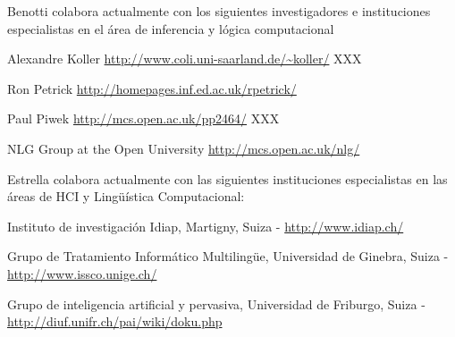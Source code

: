 Benotti colabora actualmente con los siguientes investigadores e instituciones especialistas en el \'area de inferencia y l\'ogica
computacional

\begin{myitemize}
\item Alexandre Koller \url{http://www.coli.uni-saarland.de/~koller/} XXX

\item Ron Petrick \url{http://homepages.inf.ed.ac.uk/rpetrick/}

\item Paul Piwek \url{http://mcs.open.ac.uk/pp2464/} XXX

\item NLG Group at the Open University \url{http://mcs.open.ac.uk/nlg/}
\end{myitemize}

Estrella colabora actualmente con las siguientes instituciones especialistas en las \'areas de HCI y  Ling\"u\'istica Computacional:
\begin{myitemize}
    \item  Instituto de investigaci\'on Idiap, Martigny, Suiza -  \url{http://www.idiap.ch/}
\item Grupo de Tratamiento Inform\'atico Multiling\"ue, Universidad de Ginebra, Suiza - \url{http://www.issco.unige.ch/}
\item Grupo de inteligencia artificial y pervasiva, Universidad de Friburgo, Suiza - \url{http://diuf.unifr.ch/pai/wiki/doku.php}
\end{myitemize}

